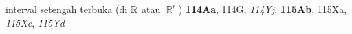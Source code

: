 \indexmedskip









































interval setengah terbuka (di $\Bbb R$ atau $\BbbR^r$) {\bf 114Aa}, 114G,
{\it 114Yj}, {\bf 115Ab}, 115Xa, {\it 115Xc}, {\it 115Yd}


















































































